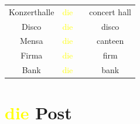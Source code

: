 \begin{center}
\begin{tabular}{|c|c|c|c|}
        Konzerthalle & \textcolor{yellow}{die} &                         & concert hall \\
        Disco        & \textcolor{yellow}{die} &                         & disco        \\
        Mensa        & \textcolor{yellow}{die} &                         & canteen      \\
        Firma        & \textcolor{yellow}{die} &                         & firm         \\
        Bank         & \textcolor{yellow}{die} &                         & bank         \\
        \hline
    \end{tabular}
\end{center}

\section{\textcolor{yellow}{die} Post}
